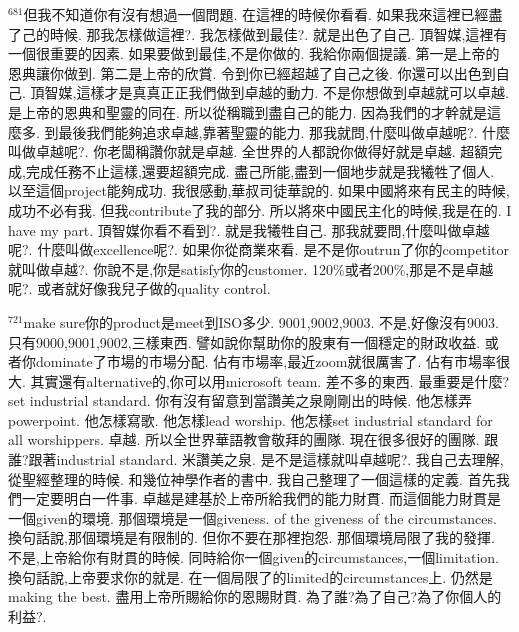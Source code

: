 \documentclass{book}
\begin{document}
$^{681}$但我不知道你有沒有想過一個問題.
在這裡的時候你看看.
如果我來這裡已經盡了己的時候.
那我怎樣做這裡?.
我怎樣做到最佳?.
就是出色了自己.
頂智媒,這裡有一個很重要的因素.
如果要做到最佳,不是你做的.
我給你兩個提議.
第一是上帝的恩典讓你做到.
第二是上帝的欣賞.
令到你已經超越了自己之後.
你還可以出色到自己.
頂智媒,這樣才是真真正正我們做到卓越的動力.
不是你想做到卓越就可以卓越.
是上帝的恩典和聖靈的同在.
所以從稱職到盡自己的能力.
因為我們的才幹就是這麼多.
到最後我們能夠追求卓越,靠著聖靈的能力.
那我就問,什麼叫做卓越呢?.
什麼叫做卓越呢?.
你老闆稱讚你就是卓越.
全世界的人都說你做得好就是卓越.
超額完成,完成任務不止這樣,還要超額完成.
盡己所能,盡到一個地步就是我犧牲了個人.
以至這個project能夠成功.
我很感動,華叔司徒華說的.
如果中國將來有民主的時候,成功不必有我.
但我contribute了我的部分.
所以將來中國民主化的時候,我是在的.
I have my part.
頂智媒你看不看到?.
就是我犧牲自己.
那我就要問,什麼叫做卓越呢?.
什麼叫做excellence呢?.
如果你從商業來看.
是不是你outrun了你的competitor就叫做卓越?.
你說不是,你是satisfy你的customer.
120\%或者200\%,那是不是卓越呢?.
或者就好像我兒子做的quality control.

$^{721}$make sure你的product是meet到ISO多少.
9001,9002,9003.
不是,好像沒有9003.
只有9000,9001,9002,三樣東西.
譬如說你幫助你的股東有一個穩定的財政收益.
或者你dominate了市場的市場分配.
佔有市場率,最近zoom就很厲害了.
佔有市場率很大.
其實還有alternative的,你可以用microsoft team.
差不多的東西.
最重要是什麼?set industrial standard.
你有沒有留意到當讚美之泉剛剛出的時候.
他怎樣弄powerpoint.
他怎樣寫歌.
他怎樣lead worship.
他怎樣set industrial standard for all worshippers.
卓越.
所以全世界華語教會敬拜的團隊.
現在很多很好的團隊.
跟誰?跟著industrial standard.
米讚美之泉.
是不是這樣就叫卓越呢?.
我自己去理解,從聖經整理的時候.
和幾位神學作者的書中.
我自己整理了一個這樣的定義.
首先我們一定要明白一件事.
卓越是建基於上帝所給我們的能力財貫.
而這個能力財貫是一個given的環境.
那個環境是一個giveness.
of the giveness of the circumstances.
換句話說,那個環境是有限制的.
但你不要在那裡抱怨.
那個環境局限了我的發揮.
不是,上帝給你有財貫的時候.
同時給你一個given的circumstances,一個limitation.
換句話說,上帝要求你的就是.
在一個局限了的limited的circumstances上.
仍然是making the best.
盡用上帝所賜給你的恩賜財貫.
為了誰?為了自己?為了你個人的利益?.
\end{document}
